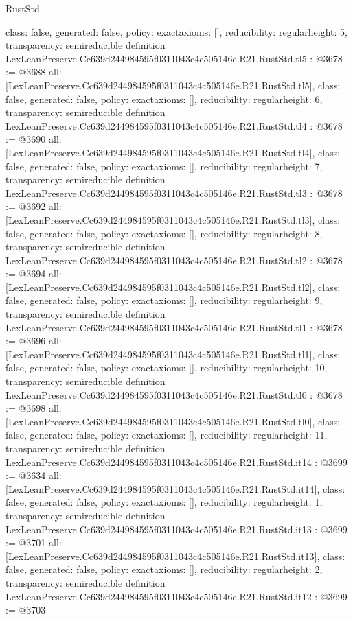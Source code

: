 \begin{lexlean}{RustStd}
\begin{coremodule}
{  class: false,
  generated: false,
  policy: exact{axioms: []},
  reducibility: regular{height: 5},
  transparency: semireducible
}
definition LexLeanPreserve.Cc639d244984595f0311043c4c505146e.R21.RustStd.tl5 : @3678 := @3688 {
  all: [LexLeanPreserve.Cc639d244984595f0311043c4c505146e.R21.RustStd.tl5],
  class: false,
  generated: false,
  policy: exact{axioms: []},
  reducibility: regular{height: 6},
  transparency: semireducible
}
definition LexLeanPreserve.Cc639d244984595f0311043c4c505146e.R21.RustStd.tl4 : @3678 := @3690 {
  all: [LexLeanPreserve.Cc639d244984595f0311043c4c505146e.R21.RustStd.tl4],
  class: false,
  generated: false,
  policy: exact{axioms: []},
  reducibility: regular{height: 7},
  transparency: semireducible
}
definition LexLeanPreserve.Cc639d244984595f0311043c4c505146e.R21.RustStd.tl3 : @3678 := @3692 {
  all: [LexLeanPreserve.Cc639d244984595f0311043c4c505146e.R21.RustStd.tl3],
  class: false,
  generated: false,
  policy: exact{axioms: []},
  reducibility: regular{height: 8},
  transparency: semireducible
}
definition LexLeanPreserve.Cc639d244984595f0311043c4c505146e.R21.RustStd.tl2 : @3678 := @3694 {
  all: [LexLeanPreserve.Cc639d244984595f0311043c4c505146e.R21.RustStd.tl2],
  class: false,
  generated: false,
  policy: exact{axioms: []},
  reducibility: regular{height: 9},
  transparency: semireducible
}
definition LexLeanPreserve.Cc639d244984595f0311043c4c505146e.R21.RustStd.tl1 : @3678 := @3696 {
  all: [LexLeanPreserve.Cc639d244984595f0311043c4c505146e.R21.RustStd.tl1],
  class: false,
  generated: false,
  policy: exact{axioms: []},
  reducibility: regular{height: 10},
  transparency: semireducible
}
definition LexLeanPreserve.Cc639d244984595f0311043c4c505146e.R21.RustStd.tl0 : @3678 := @3698 {
  all: [LexLeanPreserve.Cc639d244984595f0311043c4c505146e.R21.RustStd.tl0],
  class: false,
  generated: false,
  policy: exact{axioms: []},
  reducibility: regular{height: 11},
  transparency: semireducible
}
definition LexLeanPreserve.Cc639d244984595f0311043c4c505146e.R21.RustStd.it14 : @3699 := @3634 {
  all: [LexLeanPreserve.Cc639d244984595f0311043c4c505146e.R21.RustStd.it14],
  class: false,
  generated: false,
  policy: exact{axioms: []},
  reducibility: regular{height: 1},
  transparency: semireducible
}
definition LexLeanPreserve.Cc639d244984595f0311043c4c505146e.R21.RustStd.it13 : @3699 := @3701 {
  all: [LexLeanPreserve.Cc639d244984595f0311043c4c505146e.R21.RustStd.it13],
  class: false,
  generated: false,
  policy: exact{axioms: []},
  reducibility: regular{height: 2},
  transparency: semireducible
}
definition LexLeanPreserve.Cc639d244984595f0311043c4c505146e.R21.RustStd.it12 : @3699 := @3703 {
}
\end{coremodule}
\end{lexlean}
